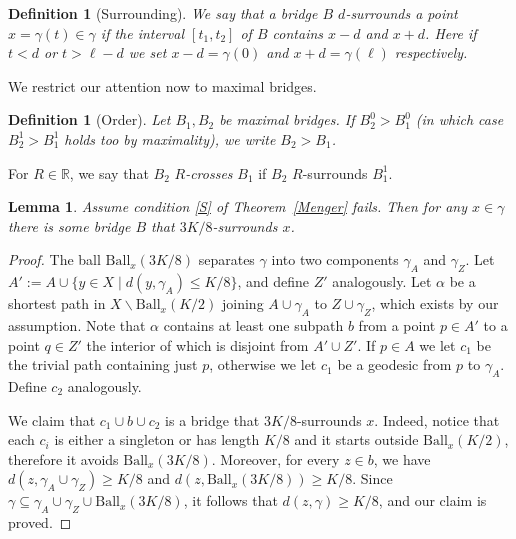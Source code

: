 \documentclass[a4paper]{article}
\newcommand{\defi}[1]{{\color{darkgray}\emph{#1}}}
\newtheorem{definition}[proposition]{Definition}
\newtheorem{lemma}[proposition]{Lemma}
\newcommand{\R}{\ensuremath{\mathbb R}}
\newcommand{\sm}{\backslash}
\newcommand{\Tr}[1]{Theorem~\ref{#1}}
\newcommand{\ball}{\mathrm{Ball}}
\begin{document}
\begin{definition}[Surrounding] \label{surround}
We say that a bridge $B$ $d$-\textit{surrounds} a point $x=\gamma (t)\in \gamma $ if the interval $[t_1,t_2]$ of $B$
contains $x-d$ and $x+d$. Here if $t<d$ or $t>\ell -d$ we set $x-d=\gamma (0)$ and $x+d=\gamma (\ell)$ respectively.
\end{definition}

We restrict our attention now to maximal bridges.


\begin{definition}[Order] \label{order}
Let  $B_1, B_2$ be maximal bridges. If $B_2^0 > B_1^0$ (in which case $B_2^1 > B_1^1$ holds too by maximality), we write $B_2>B_1$. 
\end{definition}


For $R\in \R$, we say that $B_2$ \defi{$R$-crosses}  $B_1$ if $B_2$ $R$-surrounds $B_1^1$. 


\begin{lemma} \label{bridge}
Assume condition \ref{S} of \Tr{Menger} fails. Then for any $x\in \gamma $ there is some bridge $B$ that $3K/8$-surrounds $x$. 
\end{lemma}
\begin{proof}
The ball $\ball_x(3K/8)$ separates $\gamma$ into two components $\gamma_A$ and $\gamma_Z$. Let $A':= A \cup \{y\in X \mid d(y, \gamma_A) \leq K/8 \}$, and define $Z'$ analogously. Let $\alpha$ be a shortest path in $X \sm \ball_x(K/2)$ joining $A\cup \gamma_A$ to $Z\cup \gamma_Z$, which exists by our assumption. Note that $\alpha$ contains at least one subpath $b$ from a point $p\in A'$ to a point $q\in Z'$ the interior of which is disjoint from $A' \cup Z'$. If $p\in A$ we let $c_1$ be the trivial path containing just $p$, otherwise we let $c_1$ be a geodesic from $p$ to $\gamma_A$. Define $c_2$ analogously.
 
We claim that $c_1 \cup b \cup c_2$ is a bridge that $3K/8$-surrounds $x$. Indeed, notice that each $c_i$ is either a singleton or has length $K/8$ and it starts outside $\ball_x(K/2)$, therefore it avoids $\ball_x(3K/8)$. Moreover, for every $z\in b$, we have  
$d(z, \gamma_A \cup \gamma_Z) \geq K/8$ and $d(z,\ball_x(3K/8))\geq K/8$. Since $\gamma\subseteq \gamma_A \cup \gamma_Z \cup \ball_x(3K/8)$, it follows that $d(z,\gamma )\geq K/8$, and our claim is proved. 

\end{proof}
\end{document}

